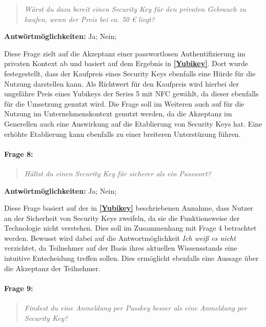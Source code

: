 \begin{quote}
    \textit{Wärst du dazu bereit einen Security Key für den privaten Gebrauch zu kaufen, wenn der Preis bei ca. 50 € liegt?}
\end{quote}

\textbf{Antwörtmöglichkeiten:} Ja; Nein;

Diese Frage zielt auf die Akzeptanz einer passwortlosen Authentifizierung im privaten Kontext ab und basiert auf dem Ergebnis in \textbf{\ref{Yubikey}}. Dort wurde festegestellt, dass der Kaufpreis eines Security Keys ebenfalls eine Hürde für die Nutzung darstellen kann. Als Richtwert für den Kaufpreis wird hierbei der ungefähre Preis eines Yubikeys der Series 5 mit NFC gewählt, da dieser ebenfalls für die Umsetzung genutzt wird. Die Frage soll im Weiteren auch auf für die Nutzung im Unternehmenskontext genutzt werden, da die Akzeptanz im Generellen auch eine Auswirkung auf die Etablierung von Security Keys hat. Eine erhöhte Etablierung kann ebenfalls zu einer breiteren Unterstüzung führen.

\paragraph{Frage 8:}

\begin{quote}
    \textit{Hältst du einen Security Key für sicherer als ein Passwort?}
\end{quote}

\textbf{Antwörtmöglichkeiten:} Ja; Nein;

Diese Frage basiert auf der in \textbf{\ref{Yubikey}} beschriebenen Annahme, dass Nutzer an der Sicherheit von Security Keys zweifeln, da sie die Funktionsweise der Technologie nicht verstehen. Dies soll im Zusammenhang mit Frage 4 betrachtet werden. Bewusst wird dabei auf die Antwortmöglichkeit \textit{Ich weiß es nicht} verzichtet, da Teilnehmer auf der Basis ihres aktuellen Wissensstands eine intuitive Entscheidung treffen sollen. Dies ermöglicht ebenfalls eine Aussage über die Akzeptanz der Teilnehmer. 

\paragraph{Frage 9:}

\begin{quote}
    \textit{Findest du eine Anmeldung per Passkey besser als eine Anmeldung per Security Key?}
\end{quote}

